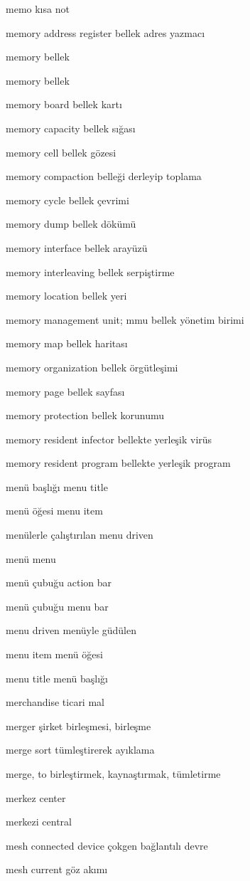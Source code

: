 \documentclass[12pt,fleqn]{article}\usepackage{../../common}
\begin{document}
memo kısa not

memory address register bellek adres yazmacı

memory bellek

memory bellek

memory board bellek kartı

memory capacity bellek sığası

memory cell bellek gözesi

memory compaction belleği derleyip toplama

memory cycle bellek çevrimi

memory dump bellek dökümü

memory interface bellek arayüzü

memory interleaving bellek serpiştirme

memory location bellek yeri

memory management unit; mmu bellek yönetim birimi

memory map bellek haritası

memory organization bellek örgütleşimi

memory page bellek sayfası

memory protection bellek korunumu

memory resident infector bellekte yerleşik virüs

memory resident program bellekte yerleşik program

menü başlığı menu title

menü öğesi menu item

menülerle çalıştırılan menu driven

menü menu

menü çubuğu action bar

menü çubuğu menu bar

menu driven menüyle güdülen

menu item menü öğesi

menu title menü başlığı

merchandise ticari mal

merger şirket birleşmesi, birleşme

merge sort tümleştirerek ayıklama

merge, to birleştirmek, kaynaştırmak, tümletirme

merkez center

merkezi central

mesh connected device çokgen bağlantılı devre

mesh current göz akımı
\end{document}
